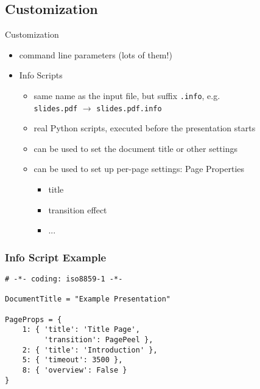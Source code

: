 \documentclass[bigger,hyperref={colorlinks=true,linkcolor=white,urlcolor=blue}]{beamer}
\begin{document}
\subsection{Customization}
\begin{frame}{Customization}
    \begin{itemize}
        \item command line parameters (lots of them!)
        \item {\glqq}Info Scripts{\grqq}
        \begin{itemize}
            \item same name as the input file, but suffix \texttt{.info}, e.g. \\
                  \texttt{slides.pdf} $\rightarrow$ \texttt{slides.pdf.info}
            \item real Python scripts, executed before the presentation starts
            \item can be used to set the document title or other settings
            \item can be used to set up per-page settings: {\glqq}Page
                  Properties{\grqq}
                \begin{itemize}
                    \item title
                    \item transition effect
                    \item ...
                \end{itemize}
        \end{itemize}
    \end{itemize}
\end{frame}
\begin{frame}[fragile]
\frametitle{Info Script Example}
\begin{verbatim}
# -*- coding: iso8859-1 -*-

DocumentTitle = "Example Presentation"

PageProps = {
    1: { 'title': 'Title Page',
         'transition': PagePeel },
    2: { 'title': 'Introduction' },
    5: { 'timeout': 3500 },
    8: { 'overview': False }
}
\end{verbatim}
\end{frame}
\end{document}

